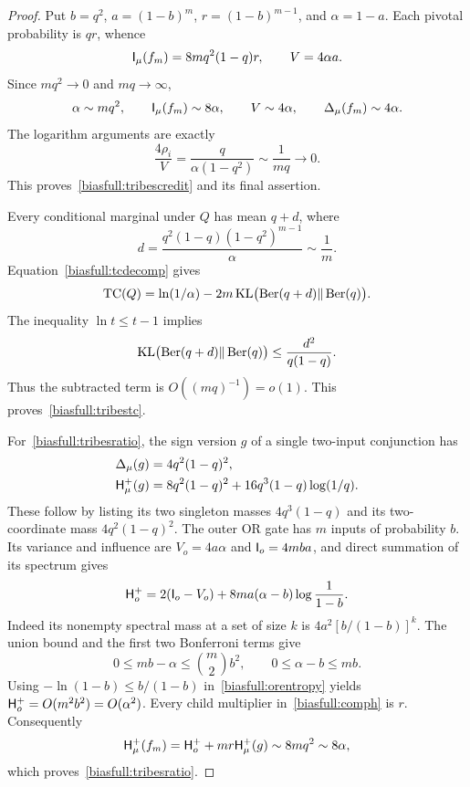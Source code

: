 \begin{proof}
Put \(b=q^2\), \(a=(1-b)^m\), \(r=(1-b)^{m-1}\), and
\(\alpha=1-a\). Each pivotal probability is \(qr\), whence
\begin{equation}\label{biasfull:tribesIV}
 \mathsf I_\mu(f_m)=8mq^2(1-q)r,\qquad V=4\alpha a.
\end{equation}
Since \(mq^2\to0\) and \(mq\to\infty\),
\[
 \alpha\sim mq^2,\qquad
 \mathsf I_\mu(f_m)\sim8\alpha,\qquad
 V\sim4\alpha,\qquad \Delta_\mu(f_m)\sim4\alpha.
\]
The logarithm arguments are exactly
\[
 \frac{4\rho_i}{V}=\frac{q}{\alpha(1-q^2)}
       \sim\frac1{mq}\longrightarrow0.
\]
This proves~\eqref{biasfull:tribescredit} and its final assertion.

Every conditional marginal under \(Q\) has mean \(q+d\), where
\[
 d=\frac{q^2(1-q)(1-q^2)^{m-1}}\alpha\sim\frac1m.
\]
Equation~\eqref{biasfull:tcdecomp} gives
\[
 \operatorname{TC}(Q)=\ln(1/\alpha)
       -2m\operatorname{KL}\bigl(\operatorname{Ber}(q+d)\|
                         \operatorname{Ber}(q)\bigr).
\]
The inequality \(\ln t\le t-1\) implies
\[
 \operatorname{KL}\bigl(\operatorname{Ber}(q+d)\|
                         \operatorname{Ber}(q)\bigr)
       \le\frac{d^2}{q(1-q)}.
\]
Thus the subtracted term is \(O((mq)^{-1})=o(1)\).
This proves~\eqref{biasfull:tribestc}.

For~\eqref{biasfull:tribesratio}, the sign version \(g\) of a single
two-input conjunction has
\begin{align}
 \Delta_\mu(g)&=4q^2(1-q)^2,\notag\\
 \mathsf H_\mu^+(g)&=8q^2(1-q)^2
                  +16q^3(1-q)\log(1/q).
                    \label{biasfull:andpair}
\end{align}
These follow by listing its two singleton masses
\(4q^3(1-q)\) and its two-coordinate mass \(4q^2(1-q)^2\).
The outer OR gate has \(m\) inputs of probability \(b\).
Its variance and influence are \(V_o=4a\alpha\) and
\(\mathsf I_o=4mba\), and direct summation of its spectrum gives
\begin{equation}\label{biasfull:orentropy}
 \mathsf H_o^+=2(\mathsf I_o-V_o)
           +8ma(\alpha-b)\log\frac1{1-b}.
\end{equation}
Indeed its nonempty spectral mass at a set of size \(k\) is
\(4a^2[b/(1-b)]^k\).
The union bound and the first two Bonferroni terms give
\[
 0\le mb-\alpha\le\binom m2b^2,\qquad
 0\le\alpha-b\le mb.
\]
Using \(-\ln(1-b)\le b/(1-b)\) in~\eqref{biasfull:orentropy}
yields \(\mathsf H_o^+=O(m^2b^2)=O(\alpha^2)\).
Every child multiplier in~\eqref{biasfull:comph} is \(r\).
Consequently
\[
 \mathsf H_\mu^+(f_m)=\mathsf H_o^++mr\mathsf H_\mu^+(g)
       \sim8mq^2\sim8\alpha,
\]
which proves~\eqref{biasfull:tribesratio}.
\end{proof}


